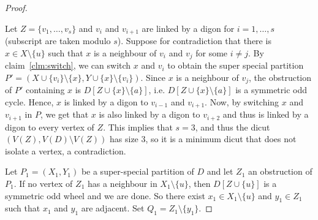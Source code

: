 \begin{proof}
    \begin{proofclaim} 
        Let $Z=\{v_1, \dots, v_s\}$ and $v_i$ and $v_{i+1}$ are linked by a digon for $i=1, \dots, s$ (subscript are taken modulo $s$). Suppose for contradiction that there is
        $x \in X \setminus \{u\}$ such that $x$ is a neighbour of $v_i$ and $v_j$ for some $i \neq j$. 
        By claim~\ref{clm:switch}, we can switch $x$ and $v_i$ to obtain the super special partition $P' = (X \cup \{v_i\} \setminus \{x\} , Y \cup \{x\} \setminus \{v_i\} )$. Since $x$ is a neighbour of $v_j$, the obstruction of $P'$  containing $x$ is $D[Z \cup \{x\} \setminus \{a\}]$, i.e. $D[Z \cup \{x\} \setminus \{a\}]$ is a symmetric odd cycle. Hence, $x$ is linked by a digon to $v_{i-1}$ and $v_{i+1}$. Now, by switching $x$ and $v_{i+1}$ in $P$, we get that $x$ is also linked by a digon to $v_{i+2}$ and thus is linked by a digon to every vertex of $Z$. 
        This implies that $s=3$, and thus the dicut $(V(Z),V(D) \setminus V(Z))$ has size $3$, so it is a minimum dicut that does not isolate a vertex, a contradiction. 
    \end{proofclaim}

    Let $P_1=(X_1, Y_1)$ be a super-special partition of $D$ and let $Z_1$ an obstruction of $P_1$. If no vertex of $Z_1$ has a neighbour in $X_1 \setminus \{u\}$, then $D[Z \cup \{u\}]$ is a symmetric odd wheel and we are done. So there exist $x_1 \in X_1 \setminus \{u\}$ and $y_1 \in Z_1$ such that $x_1$ and $y_1$ are adjacent. Set $Q_1 = Z_1 \setminus \{y_1\}$. 
    

\end{proof}

